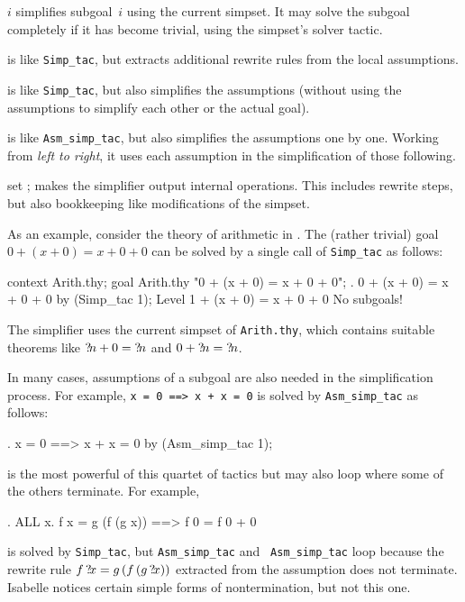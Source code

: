 \begin{ttdescription}
\item[\ttindexbold{Simp_tac} $i$] simplifies subgoal~$i$ using the
  current simpset.  It may solve the subgoal completely if it has
  become trivial, using the simpset's solver tactic.
  
\item[\ttindexbold{Asm_simp_tac}]
  is like \verb$Simp_tac$, but extracts additional rewrite rules from
  the local assumptions.
  
\item[\ttindexbold{Full_simp_tac}] is like \verb$Simp_tac$, but also
  simplifies the assumptions (without using the assumptions to
  simplify each other or the actual goal).
  
\item[\ttindexbold{Asm_full_simp_tac}] is like \verb$Asm_simp_tac$,
  but also simplifies the assumptions one by one.  Working from
  \emph{left to right}, it uses each assumption in the simplification
  of those following.
  
\item[set \ttindexbold{trace_simp};] makes the simplifier output
  internal operations.  This includes rewrite steps, but also
  bookkeeping like modifications of the simpset.
\end{ttdescription}

\medskip

As an example, consider the theory of arithmetic in \HOL.  The (rather
trivial) goal $0 + (x + 0) = x + 0 + 0$ can be solved by a single call
of \texttt{Simp_tac} as follows:
\begin{ttbox}
context Arith.thy;
goal Arith.thy "0 + (x + 0) = x + 0 + 0";
{. 0 + (x + 0) = x + 0 + 0}
by (Simp_tac 1);
{\out Level 1}
{ + (x + 0) = x + 0 + 0}
{\out No subgoals!}
\end{ttbox}

The simplifier uses the current simpset of \texttt{Arith.thy}, which
contains suitable theorems like ${?\!n}+0 = {?\!n}$ and $0+{?\!n} =
{?\!n}$.

\medskip In many cases, assumptions of a subgoal are also needed in
the simplification process.  For example, \texttt{x = 0 ==> x + x = 0}
is solved by \texttt{Asm_simp_tac} as follows:
\begin{ttbox}
{. x = 0 ==> x + x = 0}
by (Asm_simp_tac 1);
\end{ttbox}

 is the most powerful of this quartet
of tactics but may also loop where some of the others terminate.  For
example,
\begin{ttbox}
{. ALL x. f x = g (f (g x)) ==> f 0 = f 0 + 0}
\end{ttbox}
is solved by {\tt Simp_tac}, but {\tt Asm_simp_tac} and {\tt
  Asm_simp_tac} loop because the rewrite rule $f\,{?\!x} =
g\,(f\,(g\,{?\!x}))$ extracted from the assumption does not
terminate.  Isabelle notices certain simple forms of nontermination,
but not this one.
 

